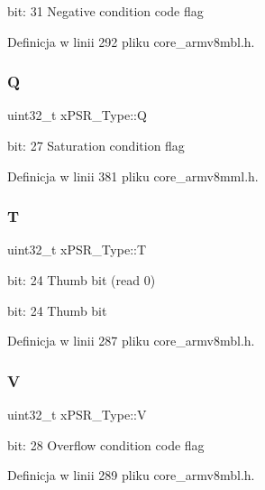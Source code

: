 bit\+: 31 Negative condition code flag 

Definicja w linii 292 pliku core\+\_\+armv8mbl.\+h.

\mbox{\label{unionx_p_s_r___type_add7cbd2b0abd8954d62cd7831796ac7c}} 
\subsubsection{\texorpdfstring{Q}{Q}}
{\footnotesize\ttfamily uint32\+\_\+t x\+P\+S\+R\+\_\+\+Type\+::Q}

bit\+: 27 Saturation condition flag 

Definicja w linii 381 pliku core\+\_\+armv8mml.\+h.

\mbox{\label{unionx_p_s_r___type_a7eed9fe24ae8d354cd76ae1c1110a658}} 
\subsubsection{\texorpdfstring{T}{T}}
{\footnotesize\ttfamily uint32\+\_\+t x\+P\+S\+R\+\_\+\+Type\+::T}

bit\+: 24 Thumb bit (read 0)

bit\+: 24 Thumb bit 

Definicja w linii 287 pliku core\+\_\+armv8mbl.\+h.

\mbox{\label{unionx_p_s_r___type_af14df16ea0690070c45b95f2116b7a0a}} 
\subsubsection{\texorpdfstring{V}{V}}
{\footnotesize\ttfamily uint32\+\_\+t x\+P\+S\+R\+\_\+\+Type\+::V}

bit\+: 28 Overflow condition code flag 

Definicja w linii 289 pliku core\+\_\+armv8mbl.\+h.

\mbox{\label{unionx_p_s_r___type_a1a47176768f45f79076c4f5b1b534bc2}} 
